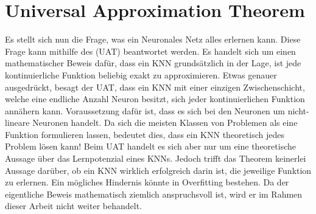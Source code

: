 \section{Universal Approximation Theorem}\label{sec:UAT}
Es stellt sich nun die Frage, was ein Neuronales Netz alles erlernen kann.
Diese Frage kann mithilfe des  (UAT)
beantwortet werden. Es handelt sich um einen mathematischer Beweis dafür, dass ein KNN
grundsätzlich in der Lage, ist jede kontinuierliche Funktion beliebig exakt zu
approximieren.
\para{}
Etwas genauer ausgedrückt, besagt der UAT, dass ein KNN mit einer einzigen
Zwischenschicht, welche eine endliche Anzahl Neuron besitzt, sich jeder kontinuierlichen
Funktion annähern kann. Voraussetzung dafür ist, dass es sich bei den
Neuronen um nicht-lineare Neuronen handelt.
Da sich die meisten Klassen von Problemen als eine Funktion formulieren
lassen, bedeutet dies, dass ein KNN theoretisch jedes Problem lösen kann!
Beim UAT handelt es sich aber nur um eine theoretische
Aussage über das Lernpotenzial eines KNNs. Jedoch trifft das Theorem keinerlei Aussage
darüber, ob ein KNN wirklich erfolgreich darin ist, die jeweilige Funktion zu erlernen.
Ein mögliches Hindernis könnte in Overfitting bestehen.
\para{}
Da der eigentliche Beweis mathematisch ziemlich anspruchsvoll ist, wird er im
Rahmen dieser Arbeit nicht weiter behandelt.
\para{}
\cite{Nielsen}
\cite{wiki:uat}


\pagebreak
